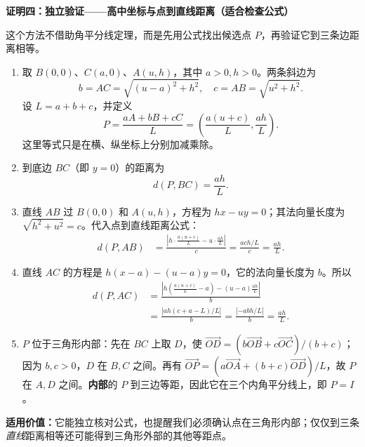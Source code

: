 \begin{proofbox}
\textbf{证明四：独立验证——高中坐标与点到直线距离（适合检查公式）}

这个方法不借助角平分线定理，而是先用公式找出候选点 $P$，再验证它到三条边距离相等。
\begin{enumerate}
\item 取 $B(0,0)$、$C(a,0)$、$A(u,h)$，其中 $a>0,h>0$。两条斜边为
\[
b=AC=\sqrt{(u-a)^2+h^2},\quad
c=AB=\sqrt{u^2+h^2}.
\]
设 $L=a+b+c$，并定义
\[
P=\frac{aA+bB+cC}{L}
=\left(\frac{a(u+c)}{L},\frac{ah}{L}\right).
\]
这里等式只是在横、纵坐标上分别加减乘除。
\item 到底边 $BC$（即 $y=0$）的距离为
\[d(P,BC)=\frac{ah}{L}.\]
\item 直线 $AB$ 过 $B(0,0)$ 和 $A(u,h)$，方程为 $hx-uy=0$；其法向量长度为 $\sqrt{h^2+u^2}=c$。代入点到直线距离公式：
\[
\begin{aligned}
d(P,AB)&=\frac{\left|h\cdot\frac{a(u+c)}L-u\cdot\frac{ah}L\right|}{c}
=\frac{ach/L}{c}=\frac{ah}{L}.
\end{aligned}
\]
\item 直线 $AC$ 的方程是 $h(x-a)-(u-a)y=0$，它的法向量长度为 $b$。所以
\[
\begin{aligned}
d(P,AC)&=\frac{\left|h\left(\frac{a(u+c)}L-a\right)-(u-a)\frac{ah}L\right|}{b}\\
&=\frac{|ah(c+a-L)/L|}{b}
=\frac{|{-abh/L}|}{b}=\frac{ah}{L}.
\end{aligned}
\]
\item $P$ 位于三角形内部：先在 $BC$ 上取 $D$，使
$\vec{OD}=(b\vec{OB}+c\vec{OC})/(b+c)$；因为 $b,c>0$，$D$ 在 $B,C$ 之间。再有
$\vec{OP}=(a\vec{OA}+(b+c)\vec{OD})/L$，故 $P$ 在 $A,D$ 之间。\textbf{内部}的 $P$ 到三边等距，因此它在三个内角平分线上，即 $P=I$。
\end{enumerate}
\textbf{适用价值：}它能独立核对公式，也提醒我们必须确认点在三角形内部；仅仅到三条\emph{直线}距离相等还可能得到三角形外部的其他等距点。
\end{proofbox}

